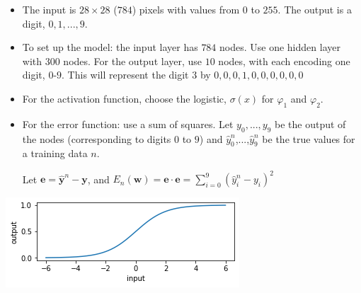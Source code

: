 \documentclass[12pt,letterpaper,noanswers]{exam}
\newcommand{\vc}[1]{\boldsymbol{#1}}
\newcommand{\note}[1]{{#1}} %
\begin{document}
\note{\begin{tcolorbox}
\begin{itemize}
\itemsep0pt
    \item The input is $28\times 28$ ($784$) pixels with values from $0$ to $255$.  The output is a digit, $0,1,...,9$.
\item To set up the model: the input layer has $784$ nodes.  Use one hidden layer with $300$ nodes.  For the output layer, use $10$ nodes, with each encoding one digit, $0$-$9$.  This will represent the digit $3$ by $0,0,0,1,0,0,0,0,0,0$
\item For the activation function, choose the logistic, $\sigma(x)$ for $\varphi_1$ and $\varphi_2$.
\item For the error function: use a sum of squares.  Let $y_0,...,y_9$ be the output of the nodes (corresponding to digits $0$ to $9$) and $\hat{y}_0^n$,...,$\hat{y}_9^n$ be the true values for a training data $n$. 

Let $\vc{e} = \vc{\hat{y}}^n-\vc{y}$, and $E_n(\vc{w}) = \vc{e}\cdot\vc{e} = \sum\limits_{i=0}^9 (\hat{y}_i^n-y_i)^2$
\end{itemize}
\end{tcolorbox}}

\renewcommand{\inputnum}{1} 
\renewcommand{\hiddennum}{1}
\renewcommand{\outputnum}{1}
\includegraphics[scale=0.7]{img/C23logistic.png}
\end{document}
